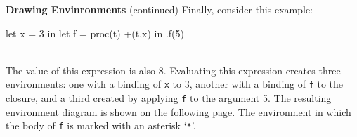 \begin{minipage}[t]{\sw}
\slidenumber
\LARGE
{\bf Drawing Envinronments} (continued)\exx
Finally, consider this example:\\[1.5ex]
\Large
\begin{verbbox}
let
  x = 3
in
  let
    f = proc(t) +(t,x)
  in
    .f(5)
\end{verbbox}
\emm\theverbbox\\[1.5ex]
\LARGE
The value of this expression is also 8.
Evaluating this expression creates three environments:
one with a binding of \verb'x' to 3,
another with a binding of \verb'f' to the closure,
and a third created by applying \verb'f' to the argument 5.
The resulting environment diagram is shown
on the following page.
The environment in which the body of \verb'f'
is marked with an asterisk `\verb'*''.
\end{minipage}
\clearpage
